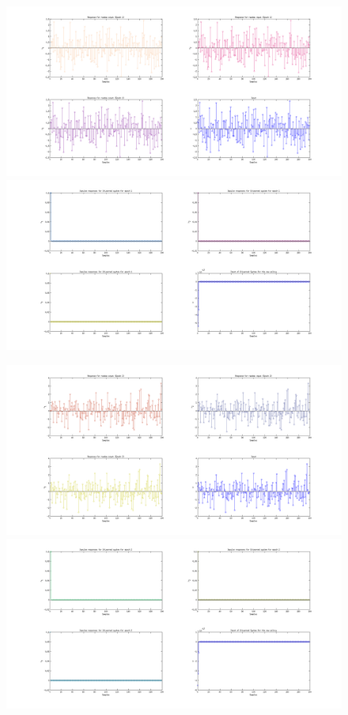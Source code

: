 \documentclass[a4paper,oneside,12pt]{article}
\begin{document}
\begin{figure}[H]
\centering
\includegraphics[scale=0.35]{s_1.png} \\
\includegraphics[scale=0.35]{q_1.png} \\
\label{}
\end{figure}

\begin{figure}[H]
\centering
\includegraphics[scale=0.35]{s_2.png} \\
\includegraphics[scale=0.35]{q_2.png} \\
\label{}
\end{figure}
\end{document}
